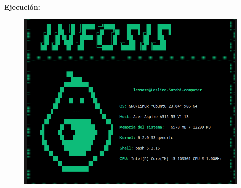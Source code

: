 \documentclass[letter,12pt]{article} %
\begin{document}
\textbf{Ejecución:} \par
\begin{figure}[H]
	\centering
	\includegraphics[scale=0.6]{imagenes/infosis.png}
\end{figure}

\end{document}
